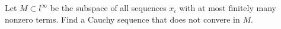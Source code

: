 Let $M\subset l^{\infty}$ be the subspace of all sequences $x_i$ with at most finitely many nonzero
terms. Find a Cauchy sequence that does not convere in $M$.\\